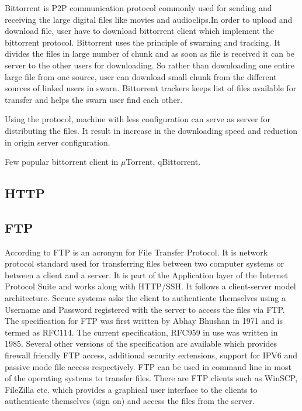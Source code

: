      Bittorrent is P2P communication protocol commonly used for
     sending and receiving the large digital files like movies and
     audioclips.In order to upload and download file, user have to
     download bittorrent client which implement the bittorrent
     protocol. Bittorrent uses the principle of swarning and
     tracking. \cite{www-bittorrent} It divides the files in large
     number of chunk and as soon as file is received it can be server
     to the other users for downloading.  So rather than downloading
     one entire large file from one source, user can download small
     chunk from the different sources of linked users in
     swarn. Bittorrent trackers keeps list of files available for
     transfer and helps the swarn user find each other.

     Using the protocol, machine with less configuration can serve as
     server for distributing the files. It result in increase in the
     downloading speed and reduction in origin server configuration.

     Few popular bittorrent client in $\mu$Torrent, qBittorrent.

\subsection{HTTP}
\subsection{FTP}

     According to \cite{www-ftp-wiki} FTP is an acronym for File Transfer
     Protocol. It is network protocol standard used for transferring
     files between two computer systems or between a client and a
     server. It is part of the Application layer of the Internet
     Protocol Suite and works along with HTTP/SSH. It follows a
     client-server model architecture. Secure systems asks the client
     to authenticate themselves using a Username and Password
     registered with the server to access the files via FTP. The
     specification for FTP was first written by Abhay Bhushan
     \cite{www-rfc114} in 1971 and is termed as RFC114. The current
     specification, RFC959 in use was written in 1985. Several other
     versions of the specification are available which provides
     firewall friendly FTP access, additional security extensions,
     support for IPV6 and passive mode file access respectively. FTP
     can be used in command line in most of the operating systems to
     transfer files. There are FTP clients such as WinSCP, FileZilla
     etc. which provides a graphical user interface to the clients to
     authenticate themselves (sign on) and access the files from the
     server.
     
